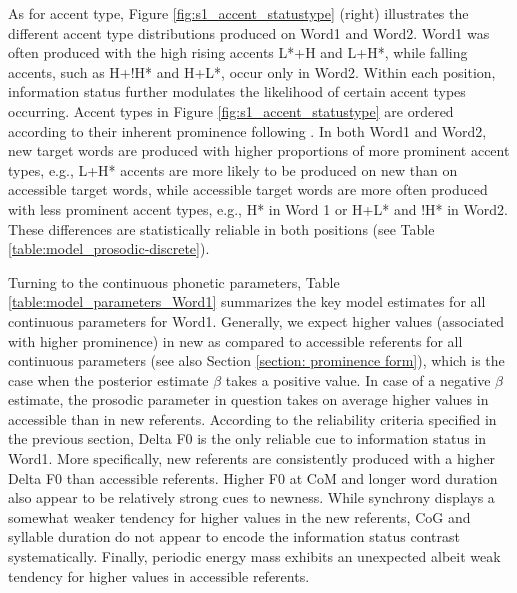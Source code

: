 As for accent type, Figure \ref{fig:s1_accent_statustype} (right) illustrates the different accent type distributions produced on Word1 and Word2. Word1 was often produced with the high rising accents L*+H and L+H*, while falling accents, such as H+!H* and H+L*, occur only in Word2. Within each position, information status further modulates the likelihood of certain accent types occurring. Accent types in Figure \ref{fig:s1_accent_statustype} are ordered according to their inherent prominence following \citet{baumannPerceptualProminencePitch2015}. In both Word1 and Word2, new target words are produced with higher proportions of more prominent accent types, e.g., L+H* accents are more likely to be produced on new than on accessible target words, while accessible target words are more often produced with less prominent accent types, e.g., H* in Word 1 or H+L* and !H* in Word2. These differences are statistically reliable in both positions (see Table \ref{table:model_prosodic-discrete}).

Turning to the continuous phonetic parameters, Table \ref{table:model_parameters_Word1} summarizes the key model estimates for all continuous parameters for Word1. Generally, we expect higher values (associated with higher prominence) in new as compared to accessible referents for all continuous parameters (see also Section \ref{section: prominence form}), which is the case when the posterior estimate $\beta$ takes a positive value. In case of a negative $\beta$ estimate, the prosodic parameter in question takes on average higher values in accessible than in new referents. According to the reliability criteria specified in the previous section, Delta F0 is the only reliable cue to information status in Word1. More specifically, new referents are consistently produced with a higher Delta F0 than accessible referents. Higher F0 at CoM and longer word duration also appear to be relatively strong cues to newness. While synchrony displays a somewhat weaker tendency for higher values in the new referents, CoG and syllable duration do not appear to encode the information status contrast systematically. Finally, periodic energy mass exhibits an unexpected albeit weak tendency for higher values in accessible referents.

